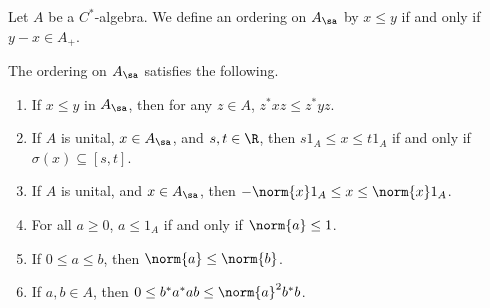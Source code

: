\begin{definition}\label{def:ordering_of_cstar_algebras}
  Let $A$ be a $C^{\ast}$-algebra. We define an ordering on $A_{\sa}$ by $x\leq y$ if and only if $y-x\in A_{+}$.
\end{definition}
\begin{proposition}
  The ordering on $A_{\sa}$ satisfies the following.
  \begin{enumerate}[(1)]
    \item If $x\leq y$ in $A_{\sa}$, then for any $z\in A$, $z^{\ast}xz \leq z^{\ast}yz$.
    \item If $A$ is unital, $x\in A_{\sa}$, and $s,t\in \R$, then $s1_A \leq x \leq t1_A$ if and only if $\sigma\left( x \right)\subseteq [s,t]$.
    \item If $A$ is unital, and $x\in A_{\sa}$, then $-\norm{x}1_A \leq x \leq \norm{x}1_A$.
    \item For all $a\geq 0$, $a\leq 1_A$ if and only if $\norm{a}\leq 1$.
    \item If $0\leq a \leq b$, then $\norm{a}\leq \norm{b}$.
    \item If $a,b\in A$, then $0\leq b^{\ast}a^{\ast}ab \leq \norm{a}^2b^{\ast}b$.
  \end{enumerate}
\end{proposition}
